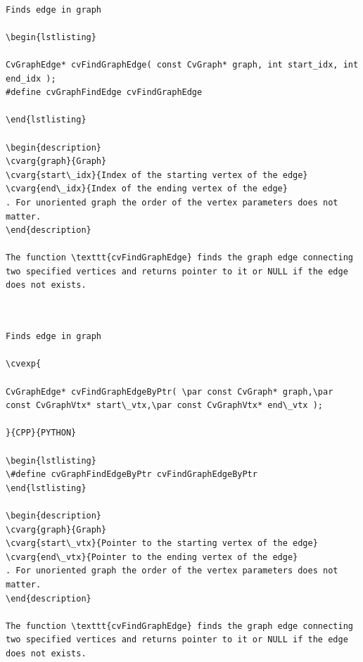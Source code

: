 \label{FindGraphEdge}
\begin{verbatim}

Finds edge in graph

\begin{lstlisting}

CvGraphEdge* cvFindGraphEdge( const CvGraph* graph, int start_idx, int end_idx );
#define cvGraphFindEdge cvFindGraphEdge

\end{lstlisting}

\begin{description}
\cvarg{graph}{Graph}
\cvarg{start\_idx}{Index of the starting vertex of the edge}
\cvarg{end\_idx}{Index of the ending vertex of the edge}
. For unoriented graph the order of the vertex parameters does not matter.
\end{description}

The function \texttt{cvFindGraphEdge} finds the graph edge connecting two specified vertices and returns pointer to it or NULL if the edge does not exists.


\end{verbatim}
\label{FindGraphEdgeByPtr}
\begin{verbatim}

Finds edge in graph

\cvexp{

CvGraphEdge* cvFindGraphEdgeByPtr( \par const CvGraph* graph,\par const CvGraphVtx* start\_vtx,\par const CvGraphVtx* end\_vtx );

}{CPP}{PYTHON}

\begin{lstlisting}
\#define cvGraphFindEdgeByPtr cvFindGraphEdgeByPtr
\end{lstlisting}

\begin{description}
\cvarg{graph}{Graph}
\cvarg{start\_vtx}{Pointer to the starting vertex of the edge}
\cvarg{end\_vtx}{Pointer to the ending vertex of the edge}
. For unoriented graph the order of the vertex parameters does not matter.
\end{description}

The function \texttt{cvFindGraphEdge} finds the graph edge connecting two specified vertices and returns pointer to it or NULL if the edge does not exists.


\end{verbatim}

